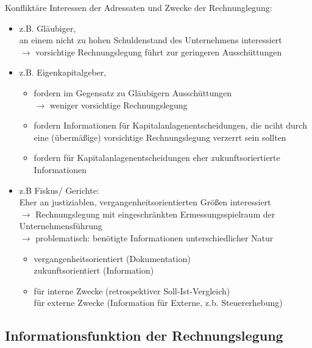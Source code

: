 \documentclass[paper=a4, fontsize=11pt]{scrartcl}
\numberwithin{equation}{section}
\numberwithin{figure}{section}
\numberwithin{table}{section}
\begin{document}
Konfliktäre Interessen der Adressaten und Zwecke der Rechnunglegung: \\
\begin{itemize}
\item z.B. Gläubiger, \\
an einem nicht zu hohen Schuldenstand des Unternehmens interessiert \\
$\rightarrow$ vorsichtige Rechnungslegung führt zur geringeren Ausschüttungen

\item z.B. Eigenkapitalgeber,
  \begin{itemize}
  \item fordern im Gegensatz zu Gläubigern Ausschüttungen \\
$\rightarrow$ weniger vorsichtige Rechnungslegung
  \item fordern Informationen für Kapitalanlagenentscheidungen, die nciht durch eine (übermäßige) vorsichtige Rechnungslegung verzerrt sein sollten
  \item fordern für Kapitalanlagenentscheidungen eher zukunftsoriertierte Informationen
\end{itemize}

\item z.B Fiskus/ Gerichte: \\
Eher an justiziablen, vergangenheitsorientierten Größen interessiert \\
$\rightarrow$ Rechnungslegung mit eingeschränkten Ermessungsspielraum der Unternehmensführung \\
$\rightarrow$ problematisch:  benötigte Informationen unterschiedlicher Natur \\
  \begin{itemize}
  \item vergangenheitsorientiert (Dokumentation) \\
zukunftsorientiert (Information)
  \item für interne Zwecke (retrospektiver Soll-Ist-Vergleich) \\
für externe Zwecke (Information für Externe, z.b. Steuererhebung)
\end{itemize}
\end{itemize}


\subsection{Informationsfunktion der Rechnungslegung}
\end{document}
